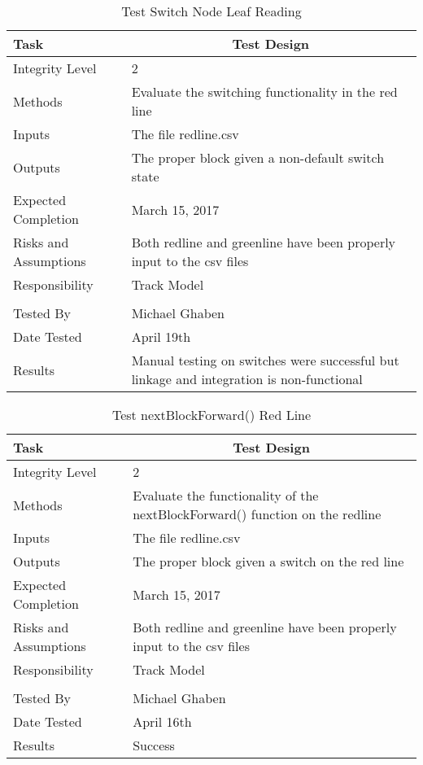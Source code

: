 \documentclass[]{article}
\begin{document}
\begin{table}[H]
	\centering
	\caption{Test Switch Node Leaf Reading}
	\begin{tabular}{|l|l|}
		\hline
		Task & \multicolumn{1}{c|}{Test Design} \\ \hline
		Integrity Level & 2 \\ \hline
		Methods & Evaluate the switching functionality in the red line\\ \hline
		Inputs &  The file redline.csv \\ \hline
		Outputs &  The proper  block given a non-default switch state\\ \hline
		Expected Completion & March 15, 2017\\ \hline
		Risks and Assumptions & Both redline and greenline have been properly input to the csv files \\ \hline
		Responsibility & Track Model\\ \hline
		\\ \hline
		Tested By   &  Michael Ghaben\\	\hline
		Date Tested & \parbox[t]{10cm}{April 19th}\\ \hline
		Results & \parbox[t]{10cm}{Manual testing on switches were successful but linkage and integration is non-functional}\\ \hline
	\end{tabular}
\end{table}

\begin{table}[H]
	\centering
	\caption{Test nextBlockForward() Red Line}
	\begin{tabular}{|l|l|}
		\hline
		Task & \multicolumn{1}{c|}{Test Design} \\ \hline
		Integrity Level & 2 \\ \hline
		Methods & Evaluate the functionality of the nextBlockForward() function on the redline \\ \hline
		Inputs &  The file redline.csv \\ \hline
		Outputs &  The proper block given a switch on the red line\\ \hline
		Expected Completion & March 15, 2017\\ \hline
		Risks and Assumptions & Both redline and greenline have been properly input to the csv files \\ \hline
		Responsibility & Track Model\\ \hline
		\\ \hline
		Tested By   &  Michael Ghaben\\	\hline
		Date Tested & \parbox[t]{10cm}{April 16th}\\ \hline
		Results & Success\\ \hline
	\end{tabular}
\end{table}
\end{document}

